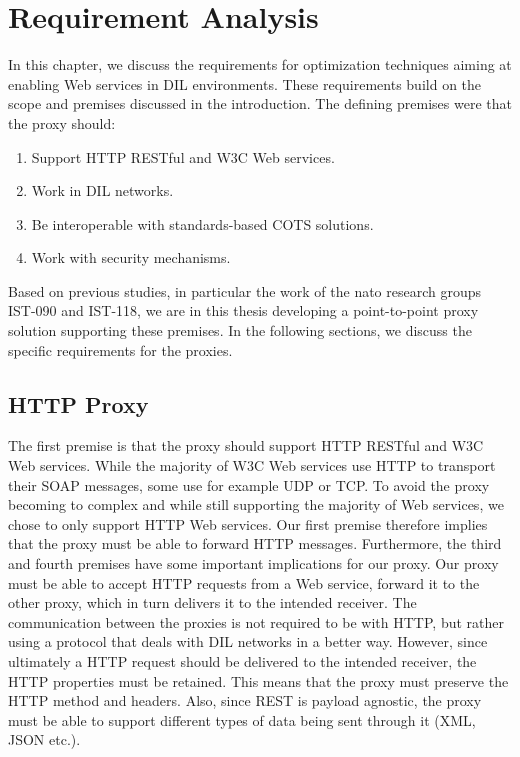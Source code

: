 \chapter{Requirement Analysis}
\label{chapter:requirements}

In this chapter, we discuss the requirements for optimization techniques aiming
at enabling Web services in DIL environments. These requirements build on the
scope and premises discussed in the introduction. The defining premises were
that the proxy should:

\begin{enumerate}
    \item Support HTTP RESTful and W3C Web services.
    \item Work in DIL networks.
    \item Be interoperable with standards-based COTS solutions.
    \item Work with security mechanisms.
\end{enumerate}

Based on previous studies, in particular the work of the \gls{nato} research
groups IST-090 and IST-118, we are in this thesis developing a point-to-point
proxy solution supporting these premises. In the following sections, we discuss
the specific requirements for the proxies.

\section{HTTP Proxy}

The first premise is that the proxy should support HTTP RESTful and W3C Web
services. While the majority of W3C Web services use HTTP to transport their
SOAP messages, some use for example UDP or TCP. To avoid the proxy becoming to
complex and while still supporting the majority of Web services, we chose to
only support HTTP Web services. Our first premise therefore implies that the
proxy must be able to forward HTTP messages. Furthermore, the third and fourth
premises have some important implications for our proxy. Our proxy must be able
to accept HTTP requests from a Web service, forward it to the other proxy, which
in turn delivers it to the intended receiver. The communication between the
proxies is not required to be with HTTP, but rather using a protocol that deals
with DIL networks in a better way. However, since ultimately a HTTP request
should be delivered to the intended receiver, the HTTP properties must be
retained. This means that the proxy must preserve the HTTP method and headers.
Also, since REST is payload agnostic, the proxy must be able to support
different types of data being sent through it (XML, JSON etc.).

